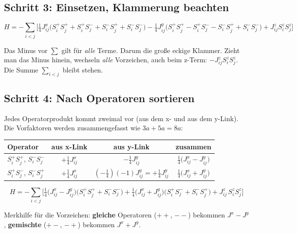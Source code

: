 \documentclass[11pt,a4paper]{article}
\begin{document}
\subsection{Schritt 3: Einsetzen, Klammerung beachten}

\[
H = -\sum_{i<j}\Big[\tfrac14 J^x_{ij}\big(S^+_iS^+_j + S^+_iS^-_j + S^-_iS^+_j + S^-_iS^-_j\big)
- \tfrac14 J^y_{ij}\big(S^+_iS^+_j - S^+_iS^-_j - S^-_iS^+_j + S^-_iS^-_j\big)
+ J^z_{ij}S^z_iS^z_j\Big]
\]

\begin{falle}
Das Minus vor $\sum$ gilt für \emph{alle} Terme. Darum die große eckige Klammer. Zieht man das Minus hinein, wechseln \emph{alle} Vorzeichen, auch beim z-Term: $-J^z_{ij}S^z_iS^z_j$. Die Summe $\sum_{i<j}$ bleibt stehen.
\end{falle}

\subsection{Schritt 4: Nach Operatoren sortieren}

Jedes Operatorprodukt kommt zweimal vor (aus dem x- und aus dem y-Link). Die Vorfaktoren werden zusammengefasst wie $3a + 5a = 8a$:

\begin{center}
\begin{tabular}{@{}lccc@{}}
\toprule
Operator & aus x-Link & aus y-Link & zusammen \\
\midrule
$S^+_iS^+_j$, $S^-_iS^-_j$ & $+\tfrac14J^x_{ij}$ & $-\tfrac14J^y_{ij}$ & $\tfrac14\big(J^x_{ij} - J^y_{ij}\big)$ \\[3pt]
$S^+_iS^-_j$, $S^-_iS^+_j$ & $+\tfrac14J^x_{ij}$ & $(-\tfrac14)(-1)J^y_{ij} = +\tfrac14J^y_{ij}$ & $\tfrac14\big(J^x_{ij} + J^y_{ij}\big)$ \\
\bottomrule
\end{tabular}
\end{center}

\begin{tcolorbox}[colback=yellow!6,colframe=orange!70!black,fonttitle=\bfseries,title=Ergebnis 1a]
\[
H = -\sum_{i<j}\Big[\tfrac14\big(J^x_{ij} - J^y_{ij}\big)\big(S^+_iS^+_j + S^-_iS^-_j\big)
+ \tfrac14\big(J^x_{ij} + J^y_{ij}\big)\big(S^+_iS^-_j + S^-_iS^+_j\big)
+ J^z_{ij}\,S^z_iS^z_j\Big]
\]
\end{tcolorbox}

\begin{merk}
Merkhilfe für die Vorzeichen: \textbf{gleiche} Operatoren ($++$, $--$) bekommen $J^x - J^y$, \textbf{gemischte} ($+-$, $-+$) bekommen $J^x + J^y$.
\end{merk}
\end{document}
